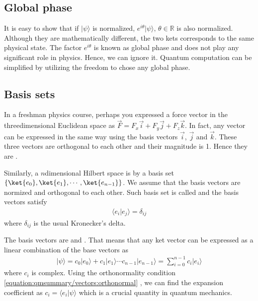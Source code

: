 \documentclass[letterpaper,10pt,english]{jupyterBook}
\begin{document}
\subsection{Global phase}
\label{\detokenize{qmsummary/vectors:global-phase}}
\sphinxAtStartPar
It is easy to show that if \(|\psi\rangle\) is normalized, \(e^{i \theta}|\psi\rangle,\,\theta \in \mathbb{R}\) is also normalized.
Although they are mathematically different, the two kets corresponds to the same physical state.  The factor \(e^{i \theta}\) is known as global phase and does not play any significant role in physics.  Hence, we can ignore it.  Quantum computation can be simplified by utilizing the freedom to chose any global phase.


\subsection{Basis sets}
\label{\detokenize{qmsummary/vectors:basis-sets}}
\sphinxAtStartPar
In a freshman physics course, perhaps you expressed a force vector in the three\sphinxhyphen{}dimensional Euclidean space as \(\vec{F} = F_x \vec{i} + F_y \vec{j} + F_z \vec{k}\).  In fact, any vector can be expressed in the same way using the basis vectors  \(\vec{i}\), \(\vec{j}\) and \(\vec{k}\).  These three vectors are orthogonal to each other and their magnitude is 1.  Hence they are .

\sphinxAtStartPar
Similarly, a \(n\)\sphinxhyphen{}dimensional Hilbert space is  by a basis set \(\{\ket{e_0}, \ket{e_1}, \cdots, \ket{e_{n-1}}\}\).  We assume that the basis vectors are normized and orthogonal to each other.  Such basis set is called  and the basis vectors satisfy
\begin{equation}\label{equation:qmsummary/vectors:orthonormal}
\begin{split}
\langle e_i | e_j \rangle = \delta_{ij}
\end{split}
\end{equation}
\sphinxAtStartPar
where \(\delta_{ij}\) is the usual Kronecker’s delta.

\sphinxAtStartPar
The basis vectors are  and .  That means that any ket vector  can be expressed as a linear combination of the base vectors as
\begin{equation}\label{equation:qmsummary/vectors:basis_expansion}
\begin{split}
|\psi\rangle = c_0 |e_0\rangle + c_1 |e_1\rangle  \cdots c_{n-1} |e_{n-1}\rangle = \sum_{i=0}^{n-1} c_i |e_i\rangle
\end{split}
\end{equation}
\sphinxAtStartPar
where \(c_i\) is complex.
Using the orthonormality condition \eqref{equation:qmsummary/vectors:orthonormal} , we can find the expansion coefficient as \(c_i=\langle  e_i|\psi \rangle\) which is a crucial quantity in quantum mechanics.
\end{document}
